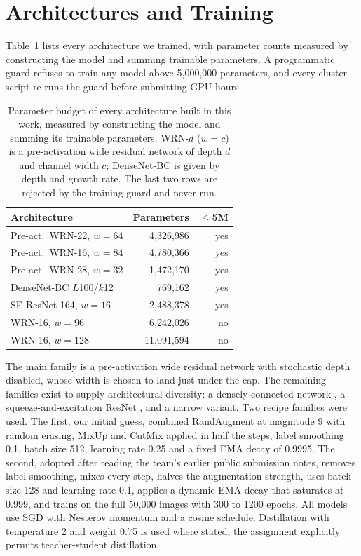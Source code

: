 \documentclass[letterpaper]{article} %
\begin{document}
\section{Architectures and Training}
\label{sec:method}

Table~\ref{tab:budget} lists every architecture we trained, with parameter counts measured by
constructing the model and summing trainable parameters. A programmatic guard refuses to train
any model above 5{,}000{,}000 parameters, and every cluster script re-runs the guard before
submitting GPU hours.

\begin{table}[t]
\centering
\footnotesize
\setlength{\tabcolsep}{4pt}
\begin{tabular}{lrr}
\toprule
Architecture & Parameters & $\le$5M \\
\midrule
Pre-act.\ WRN-22, $w{=}64$ & 4{,}326{,}986 & yes \\
Pre-act.\ WRN-16, $w{=}84$ & 4{,}780{,}366 & yes \\
Pre-act.\ WRN-28, $w{=}32$ & 1{,}472{,}170 & yes \\
DenseNet-BC $L$100/$k$12 & 769{,}162 & yes \\
SE-ResNet-164, $w{=}16$ & 2{,}488{,}378 & yes \\
\midrule
WRN-16, $w{=}96$ & 6{,}242{,}026 & no \\
WRN-16, $w{=}128$ & 11{,}091{,}594 & no \\
\bottomrule
\end{tabular}
\caption{Parameter budget of every architecture built in this work, measured by constructing
the model and summing its trainable parameters. WRN-$d$ ($w{=}c$) is a pre-activation wide
residual network of depth $d$ and channel width $c$; DenseNet-BC is given by depth and growth
rate. The last two rows are rejected by the training guard and never run.}
\label{tab:budget}
\end{table}

The main family is a pre-activation wide residual network \citep{zagoruyko2016wide} with
stochastic depth disabled, whose width is chosen to land just under the cap. The remaining
families exist to supply architectural diversity: a densely connected network
\citep{huang2017densely}, a squeeze-and-excitation ResNet \citep{hu2018squeeze}, and a narrow
variant. Two recipe families were used. The first, our initial guess, combined RandAugment
\citep{cubuk2019randaugment} at magnitude 9 with random erasing, MixUp \citep{zhang2018mixup}
and CutMix \citep{yun2019cutmix} applied in half the steps, label smoothing 0.1, batch size
512, learning rate 0.25 and a fixed EMA decay of 0.9995. The second, adopted after reading the
team's earlier public submission notes, removes label smoothing, mixes every step, halves the
augmentation strength, uses batch size 128 and learning rate 0.1, applies a dynamic EMA decay
that saturates at 0.999, and trains on the full 50{,}000 images with 300 to 1200 epochs. All
models use SGD with Nesterov momentum and a cosine schedule. Distillation
\citep{hinton2015distilling} with temperature 2 and weight 0.75 is used where stated; the
assignment explicitly permits teacher-student distillation.
\end{document}

